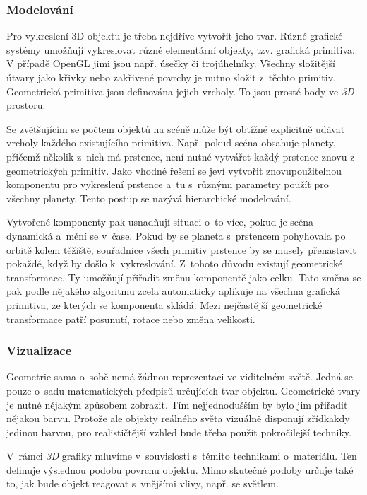 \documentclass[a4paper,12pt]{article}
\begin{document}
\subsubsection{Modelování}

Pro vykreslení 3D objektu je třeba nejdříve vytvořit jeho tvar. Různé grafické systémy umožňují vykreslovat různé elementární objekty, tzv. grafická primitiva. V případě OpenGL jimi jsou např. úsečky či trojúhelníky. Všechny složitější útvary jako křivky nebo zakřivené povrchy je nutno složit z~těchto primitiv. Geometrická primitiva jsou definována jejich vrcholy. To jsou prosté body ve \textit{3D} prostoru.~\cite{graphic}

Se zvětšujícím se počtem objektů na scéně může být obtížné explicitně udávat vrcholy každého existujícího primitiva. Např. pokud scéna obsahuje planety, přičemž několik z~nich má prstence, není nutné vytvářet každý prstenec znovu z geometrických primitiv. Jako vhodné řešení se jeví vytvořit znovupoužitelnou komponentu pro vykreslení prstence a~tu s~různými parametry použít pro všechny planety. Tento postup se nazývá hierarchické modelování.~\cite{graphic}

Vytvořené komponenty pak usnadňují situaci o~to více, pokud je scéna dynamická a~mění se v~čase. Pokud by se planeta s~prstencem pohyhovala po orbitě kolem těžiště, souřadnice všech primitiv prstence by se musely přenastavit pokaždé, když by došlo k~vykreslování. Z~tohoto důvodu existují geometrické transformace. Ty umožňují přiřadit změnu komponentě jako celku. Tato změna se pak podle nějakého algoritmu zcela automaticky aplikuje na všechna grafická primitiva, ze kterých se komponenta skládá. Mezi nejčastější geometrické transformace patří posunutí, rotace nebo změna velikosti.~\cite{graphic}

\subsubsection{Vizualizace}

Geometrie sama o~sobě nemá žádnou reprezentaci ve viditelném světě. Jedná se pouze o~sadu matematických předpisů určujících tvar objektu. Geometrické tvary je nutné nějakým způsobem zobrazit. Tím nejjednodušším by bylo jim přiřadit nějakou barvu. Protože ale objekty reálného světa vizuálně disponují zřídkakdy jedinou barvou, pro realističtější vzhled bude třeba použít pokročilejší techniky.~\cite{graphic}

V~rámci \textit{3D} grafiky mluvíme v~souvislosti s~těmito technikami o~materiálu. Ten definuje výslednou podobu povrchu objektu. Mimo skutečné podoby určuje také to, jak bude objekt reagovat s~vnějšími vlivy, např. se světlem.~\cite{graphic}
\end{document}
